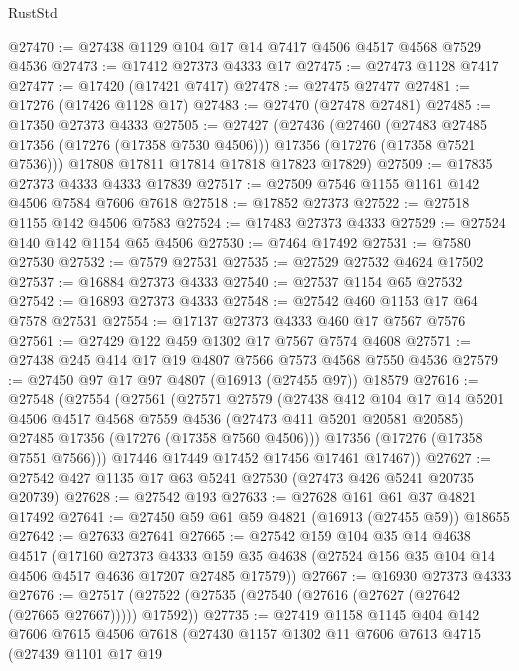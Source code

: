 \begin{lexlean}{RustStd}
\begin{coremodule}
@27470 := @27438 @1129 @104 @17 @14 @7417 @4506 @4517 @4568 @7529 @4536
@27473 := @17412 @27373 @4333 @17
@27475 := @27473 @1128 @7417
@27477 := @17420 (@17421 @7417)
@27478 := @27475 @27477
@27481 := @17276 (@17426 @1128 @17)
@27483 := @27470 (@27478 @27481)
@27485 := @17350 @27373 @4333
@27505 := @27427
    (@27436
      (@27460
        (@27483 @27485 @17356 (@17276 (@17358 @7530 @4506)))
        @17356
        (@17276 (@17358 @7521 @7536)))
      @17808
      @17811
      @17814
      @17818
      @17823
      @17829)
@27509 := @17835 @27373 @4333 @4333 @17839
@27517 := @27509 @7546 @1155 @1161 @142 @4506 @7584 @7606 @7618
@27518 := @17852 @27373
@27522 := @27518 @1155 @142 @4506 @7583
@27524 := @17483 @27373 @4333
@27529 := @27524 @140 @142 @1154 @65 @4506
@27530 := @7464 @17492
@27531 := @7580 @27530
@27532 := @7579 @27531
@27535 := @27529 @27532 @4624 @17502
@27537 := @16884 @27373 @4333
@27540 := @27537 @1154 @65 @27532
@27542 := @16893 @27373 @4333
@27548 := @27542 @460 @1153 @17 @64 @7578 @27531
@27554 := @17137 @27373 @4333 @460 @17 @7567 @7576
@27561 := @27429 @122 @459 @1302 @17 @7567 @7574 @4608
@27571 := @27438 @245 @414 @17 @19 @4807 @7566 @7573 @4568 @7550 @4536
@27579 := @27450 @97 @17 @97 @4807 (@16913 (@27455 @97)) @18579
@27616 := @27548
    (@27554
      (@27561
        (@27571
          @27579
          (@27438
            @412
            @104
            @17
            @14
            @5201
            @4506
            @4517
            @4568
            @7559
            @4536
            (@27473 @411 @5201 @20581 @20585)
            @27485
            @17356
            (@17276 (@17358 @7560 @4506)))
          @17356
          (@17276 (@17358 @7551 @7566)))
        @17446
        @17449
        @17452
        @17456
        @17461
        @17467))
@27627 := @27542 @427 @1135 @17 @63 @5241 @27530 (@27473 @426 @5241 @20735 @20739)
@27628 := @27542 @193
@27633 := @27628 @161 @61 @37 @4821 @17492
@27641 := @27450 @59 @61 @59 @4821 (@16913 (@27455 @59)) @18655
@27642 := @27633 @27641
@27665 := @27542
    @159
    @104
    @35
    @14
    @4638
    @4517
    (@17160
      @27373
      @4333
      @159
      @35
      @4638
      (@27524 @156 @35 @104 @14 @4506 @4517 @4636 @17207 @27485 @17579))
@27667 := @16930 @27373 @4333
@27676 := @27517 (@27522 (@27535 (@27540 (@27616 (@27627 (@27642 (@27665 @27667))))) @17592))
@27735 := @27419
    @1158
    @1145
    @404
    @142
    @7606
    @7615
    @4506
    @7618
    (@27430
      @1157
      @1302
      @11
      @7606
      @7613
      @4715
      (@27439
        @1101
        @17
        @19

\end{coremodule}
\end{lexlean}
